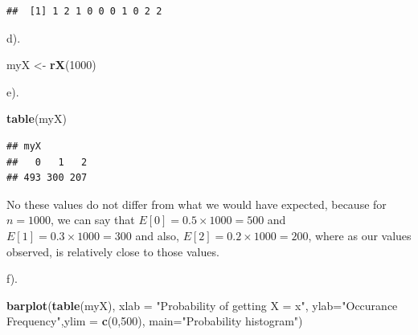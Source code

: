 \documentclass[
]{article}
\newenvironment{Shaded}{\begin{snugshade}}{\end{snugshade}}
\newcommand{\AttributeTok}[1]{\textcolor[rgb]{0.13,0.29,0.53}{#1}}
\newcommand{\DecValTok}[1]{\textcolor[rgb]{0.00,0.00,0.81}{#1}}
\newcommand{\FunctionTok}[1]{\textcolor[rgb]{0.13,0.29,0.53}{\textbf{#1}}}
\newcommand{\NormalTok}[1]{#1}
\newcommand{\OtherTok}[1]{\textcolor[rgb]{0.56,0.35,0.01}{#1}}
\newcommand{\StringTok}[1]{\textcolor[rgb]{0.31,0.60,0.02}{#1}}
\begin{document}
\begin{verbatim}
##  [1] 1 2 1 0 0 0 1 0 2 2
\end{verbatim}

d).

\begin{Shaded}
\begin{Highlighting}[]
\NormalTok{myX }\OtherTok{\textless{}{-}} \FunctionTok{rX}\NormalTok{(}\DecValTok{1000}\NormalTok{)}
\end{Highlighting}
\end{Shaded}

e).

\begin{Shaded}
\begin{Highlighting}[]
\FunctionTok{table}\NormalTok{(myX)}
\end{Highlighting}
\end{Shaded}

\begin{verbatim}
## myX
##   0   1   2 
## 493 300 207
\end{verbatim}

No these values do not differ from what we would have expected, because
for \(n = 1000\), we can say that \(E[0] = 0.5 \times 1000 = 500\) and
\(E[1] = 0.3 \times 1000 = 300\) and also,
\(E[2] = 0.2 \times 1000 = 200\), where as our values observed, is
relatively close to those values.

f).

\begin{Shaded}
\begin{Highlighting}[]
\FunctionTok{barplot}\NormalTok{(}\FunctionTok{table}\NormalTok{(myX), }\AttributeTok{xlab =} \StringTok{"Probability of getting X = x"}\NormalTok{, }
        \AttributeTok{ylab=}\StringTok{"Occurance Frequency"}\NormalTok{,}\AttributeTok{ylim =} \FunctionTok{c}\NormalTok{(}\DecValTok{0}\NormalTok{,}\DecValTok{500}\NormalTok{), }\AttributeTok{main=}\StringTok{"Probability histogram"}\NormalTok{)}
\end{Highlighting}
\end{Shaded}
\end{document}
